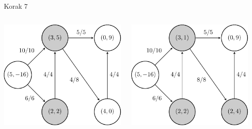 \documentclass{beamer}
\begin{document}
\begin{frame}{Korak 7}
    \begin{columns}
        \begin{column}{0.5\textwidth}
            \centering
            \includegraphics[scale=0.7]{../writing/images/graf2-9.pdf}
        \end{column}

        \begin{column}{0.5\textwidth}
            \centering
            \includegraphics[scale=0.7]{../writing/images/graf2-8.pdf}
        \end{column}
    \end{columns}
\end{frame}
\end{document}
